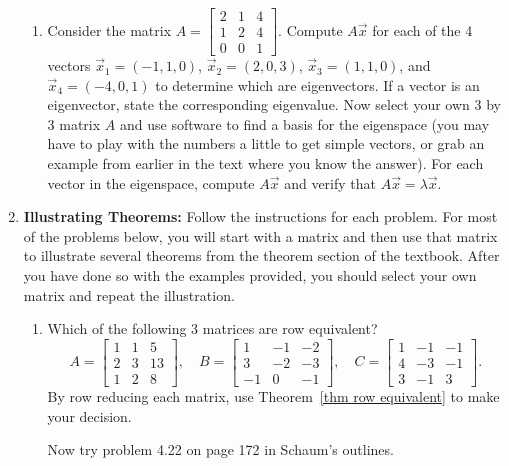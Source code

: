 \begin{enumerate}
\begin{enumerate}
	\item 
Consider the matrix $A=\begin{bmatrix}2&1&4\\ 1&2&4\\ 0&0&1\end{bmatrix}$. Compute $A\vec x$ for each of the 4 vectors 
$\vec x_1 =(-1,1,0)$, $\vec x_2=(2,0,3)$, $\vec x_3=(1,1,0)$, and $\vec x_4=( -4,0,1)$ to determine which are eigenvectors. 
If a vector is an eigenvector, state the corresponding eigenvalue. 
Now select your own 3 by 3 matrix $A$ and use software to find a basis for the eigenspace (you may have to play with the numbers a little to get simple vectors, or grab an example from earlier in the text where you know the answer). For each vector in the eigenspace, compute $A\vec x$ and verify that $A\vec x = \lambda \vec x$. 
\end{enumerate}




\item \textbf{Illustrating Theorems:}  \label{theorem problems}
Follow the instructions for each problem.  For most of the problems below, you will start with a matrix and then use that matrix to illustrate several theorems from the theorem section of the textbook.  After you have done so with the examples provided, you should select your own matrix and repeat the illustration.

\begin{enumerate}
	\item Which of the following 3 matrices are row equivalent? 
	$$
	A = 
	\begin{bmatrix}
	1 & 1 & 5 \\
	2 & 3 & 13\\
	1 & 2 & 8
	\end{bmatrix},\quad
	B = 
	\begin{bmatrix}
	1 & -1 & -2 \\
	3 & -2 & -3 \\
 	-1& 0  & -1
	\end{bmatrix},\quad
	C = 
	\begin{bmatrix}
	1 & -1 & -1 \\
	4 & -3 & -1 \\
	3 & -1 & 3	
	\end{bmatrix}.
	$$
	By row reducing each matrix, use Theorem~\ref{thm row equivalent} to make your decision. 
	
	Now try problem 4.22 on page 172 in Schaum's outlines.  
	 

\end{enumerate}
\end{enumerate}
